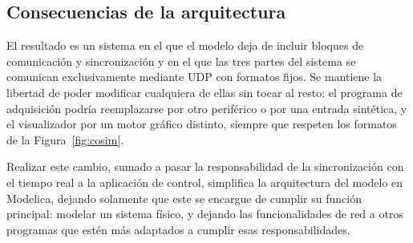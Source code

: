 

\subsection{Consecuencias de la arquitectura}

El resultado es un sistema en el que el modelo deja de incluir bloques de comunicación y sincronización y en el que las tres partes del sistema se comunican exclusivamente mediante UDP con formatos fijos. Se mantiene la libertad de poder modificar cualquiera de ellas sin tocar al resto: el programa de adquisición podría reemplazarse por otro periférico o por una entrada sintética, y el visualizador por un motor gráfico distinto, siempre que respeten los formatos de la Figura~\ref{fig:cosim}. 

Realizar este cambio, sumado a pasar la responsabilidad de la sincronización con el tiempo real a la aplicación de control, simplifica la arquitectura del modelo en Modelica, dejando solamente que este se encargue de cumplir su función principal: modelar un sistema físico, y dejando las funcionalidades de red a otros programas que estén más adaptados a cumplir esas responsabilidades.


